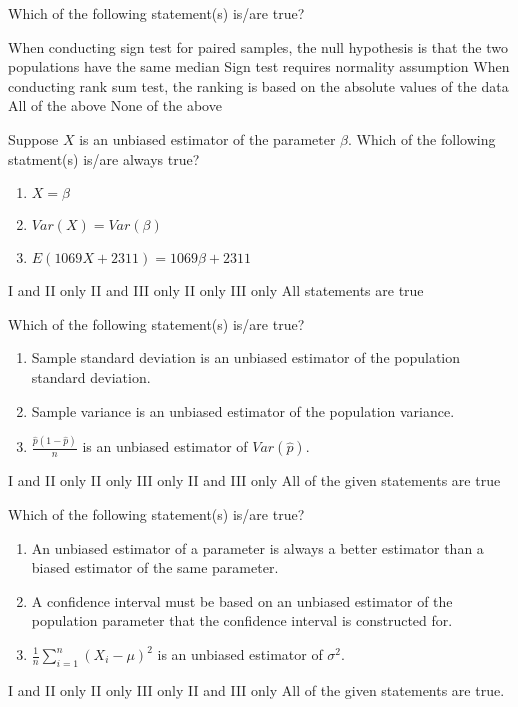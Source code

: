 \documentclass[letterpaper,10pt,addpoints]{exam}
\begin{document}
\begin{questions}
\question Which of the following statement(s) is/are true?
\begin{choices}
  \choice When conducting sign test for paired samples, the null hypothesis is that the two populations have the same median
  \choice Sign test requires normality assumption
  \choice When conducting rank sum test, the ranking is based on the absolute values of the data
  \choice All of the above
  \correctchoice None of the above
\end{choices}

\question Suppose $X$ is an unbiased estimator of the parameter $\beta$. Which of the following statment(s) is/are always true?
\begin{enumerate}[I]
  \item $X = \beta$
  \item $Var(X) = Var(\beta)$
  \item $E(1069X+2311) = 1069\beta+2311$
\end{enumerate}
\begin{choices}
  \choice I and II only
  \choice II and III only
  \choice II only
  \correctchoice III only
  \choice All statements are true
  \end{choices}


\question Which of the following statement(s) is/are true?
\begin{enumerate}[I]
  \item Sample standard deviation is an unbiased estimator of the population standard deviation.
  \item Sample variance is an unbiased estimator of the population variance.
  \item $\frac{\hat{p}(1-\hat{p})}{n}$ is an unbiased estimator of $Var(\hat{p})$.
\end{enumerate}
\begin{choices}
  \choice I and II only
  \correctchoice II only
  \choice III only
  \choice II and III only
  \choice All of the given statements are true
  \end{choices}

\question Which of the following statement(s) is/are true?
\begin{enumerate}[I]
  \item An unbiased estimator of a parameter is always a better estimator than a biased estimator of the same parameter.
  \item A confidence interval must be based on an unbiased estimator of the population parameter that the confidence interval is constructed for.
  \item $\frac{1}{n}\sum_{i=1}^n(X_i - \mu)^2$ is an unbiased estimator of $\sigma^2$.
\end{enumerate}
\begin{choices}
  \choice I and II only
  \choice II only
  \correctchoice III only
  \choice II and III only
  \choice All of the given statements are true.
  \end{choices}


\end{questions}
\end{document}
